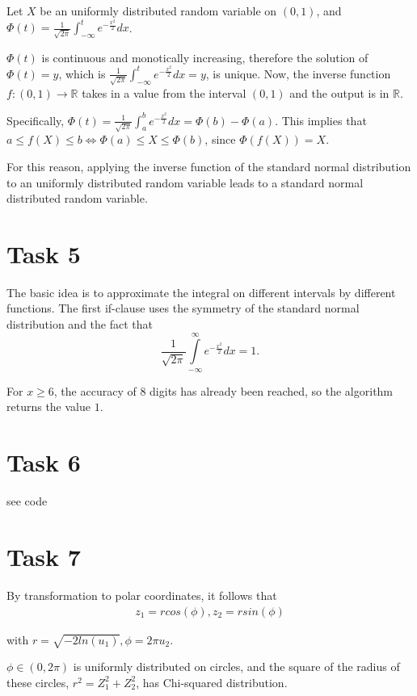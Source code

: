 \documentclass[10pt,a4paper]{article}
\begin{document}
Let $X$ be an uniformly distributed random variable on $(0,1)$, and $\Phi(t)=\frac{1}{\sqrt{2 \pi}}\int_{-\infty}^{t}e^{-\frac{x^2}{2}}dx$.
 
$\Phi(t)$ is continuous and monotically increasing, therefore the solution of $\Phi(t)=y$, which is $\frac{1}{\sqrt{2 \pi}}\int_{-\infty}^{t}e^{-\frac{x^2}{2}}dx=y$, is unique. Now, the inverse function $f:(0,1)\rightarrow \mathbb{R}$ takes in a value from the interval $(0,1)$ and the output is in $\mathbb{R}$.

Specifically, $\Phi(t)=\frac{1}{\sqrt{2 \pi}}\int_{a}^{b}e^{-\frac{x^2}{2}}dx=\Phi(b)-\Phi(a)$. This implies that $a\leq f(X) \leq b \Leftrightarrow \Phi(a)\leq X \leq \Phi(b)$, since $\Phi(f(X))=X$.

For this reason, applying the inverse function of the standard normal distribution to an uniformly distributed random variable leads to a standard normal distributed random variable.  

\section*{Task 5}

The basic idea is to approximate the integral on different intervals by different functions. The first if-clause uses the symmetry of the standard normal distribution and the fact that 
\[
	\frac{1}{\sqrt{2 \pi}}\int\limits_{-\infty}^{\infty}e^{-\frac{x^2}{2}}dx=1.
\]

For $x\geq 6$, the accuracy of $8$ digits has already been reached, so the algorithm returns the value $1$.

\section*{Task 6}

see code

\section*{Task 7}

By transformation to polar coordinates, it follows that
\begin{align*}
	z_1=r cos(\phi), z_2=r sin(\phi)
\end{align*}   

with $r=\sqrt{-2ln(u_1)}, \phi=2\pi u_2$. 

$\phi\in (0,2\pi)$ is uniformly distributed on circles, and the square of the radius of these circles, $r^2=Z_1^2+Z_2^2$, has Chi-squared distribution.
\end{document}
